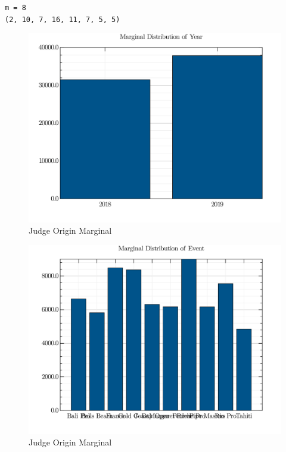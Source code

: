 \documentclass[12pt,a4paper]{article}
\begin{document}
\begin{lstlisting}
m = 8
(2, 10, 7, 16, 11, 7, 5, 5)
\end{lstlisting}


\begin{figure}
\centering
\includegraphics{visuals/marginals_YR.png}
\caption{Judge Origin Marginal}
\end{figure}
 \begin{figure}
\centering
\includegraphics{visuals/marginals_EVT.png}
\caption{Judge Origin Marginal}
\end{figure}
\end{document}
